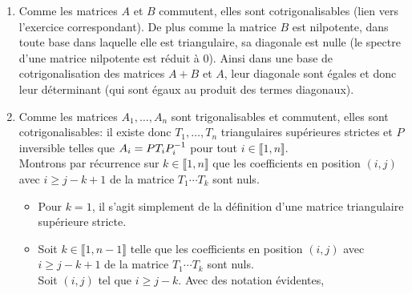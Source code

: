 \begin{solution}
    \begin{enumerate}
        \item Comme les matrices $A$ et $B$ commutent, elles sont cotrigonalisables (lien vers l'exercice correspondant). De plus comme la matrice $B$ est nilpotente, dans toute base dans laquelle elle est triangulaire, sa diagonale est nulle (le spectre d'une matrice nilpotente est réduit à $0$). Ainsi dans une base de cotrigonalisation des matrices $A+B$ et $A$, leur diagonale sont égales et donc leur déterminant (qui sont égaux au produit des termes diagonaux).
        \item {}
        Comme les matrices $A_1, \dots, A_n$ sont trigonalisables et commutent, elles sont cotrigonalisables: il existe donc $T_1, \dots, T_n$ triangulaires supérieures strictes et $P$ inversible telles que $A_i = P T_i P_i^{-1}$ pour tout $i \in \llbracket 1, n \rrbracket$. \\
        Montrons par récurrence sur $k \in \llbracket 1, n \rrbracket$ que les coefficients en position $(i, j)$ avec $i \geqslant j - k + 1$ de la matrice $T_1 \cdots T_k$ sont nuls. 
        \begin{itemize}
            \item Pour $k=1$, il s'agit simplement de la définition d'une matrice triangulaire supérieure stricte. 
            \item Soit $k \in \llbracket 1, n-1 \rrbracket$ telle que les coefficients en position $(i, j)$ avec $i \geqslant j - k + 1$ de la matrice $T_1 \cdots T_k$ sont nuls. \\
            Soit $(i, j)$ tel que $i \geqslant j - k$. Avec des notation évidentes, 
            \begin{align*}

\end{align*}
\end{itemize}
\end{enumerate}
\end{solution}
